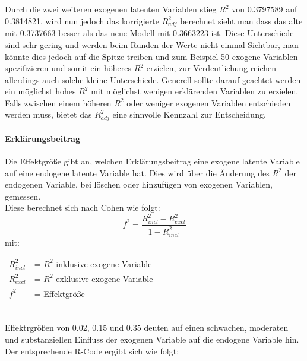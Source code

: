 \documentclass{article}\usepackage[]{graphicx}\usepackage[]{color}
\begin{document}
Durch die zwei weiteren exogenen latenten Variablen stieg $R^{2}$ von 0.3797589 auf 0.3814821, wird nun jedoch das korrigierte $R^{2}_{adj}$ berechnet sieht man dass das alte mit 0.3737663 besser als das neue Modell mit 0.3663223 ist. Diese Unterschiede sind sehr gering und werden beim Runden der Werte nicht einmal Sichtbar, man könnte dies jedoch auf die Spitze treiben und zum Beispiel 50 exogene Variablen spezifizieren und somit ein höheres $R^{2}$ erzielen, zur Verdeutlichung reichen allerdings auch solche kleine Unterschiede. Generell sollte darauf geachtet werden ein möglichst hohes $R^{2}$ mit möglichst wenigen erklärenden Variablen zu erzielen. Falls zwischen einem höheren $R^{2}$ oder weniger exogenen Variablen entschieden werden muss, bietet das $R^{2}_{adj}$ eine sinnvolle Kennzahl zur Entscheidung.

\paragraph{Erklärungsbeitrag}
Die Effektgröße gibt an, welchen Erklärungsbeitrag eine exogene latente Variable auf eine endogene latente Variable hat. Dies wird über die Änderung des $R^{2}$ der endogenen Variable, bei löschen oder hinzufügen von exogenen Variablen, gemessen.\\
Diese berechnet sich nach Cohen\cite{cohen1988statistical} wie folgt:
\begin{equation}
f^{2} = \frac{R^{2}_{incl}-R^{2}_{excl}}{1-R^{2}_{incl}}
\end{equation}
mit:\\
\begin{tabular}{lll}
$R^{2}_{incl}$ &= $R^{2}$ inklusive exogene Variable\\
$R^{2}_{excl}$ &= $R^{2}$ exklusive exogene Variable\\
$f^{2}$ &= Effektgröße
\end{tabular}
\\
Effektrgrößen von 0.02, 0.15 und 0.35 deuten auf einen schwachen, moderaten und substanziellen Einfluss der exogenen Variable auf die endogene Variable hin.\cite{cohen1988statistical,chin1998partial}\\
Der entsprechende R-Code ergibt sich wie folgt:
\end{document}
